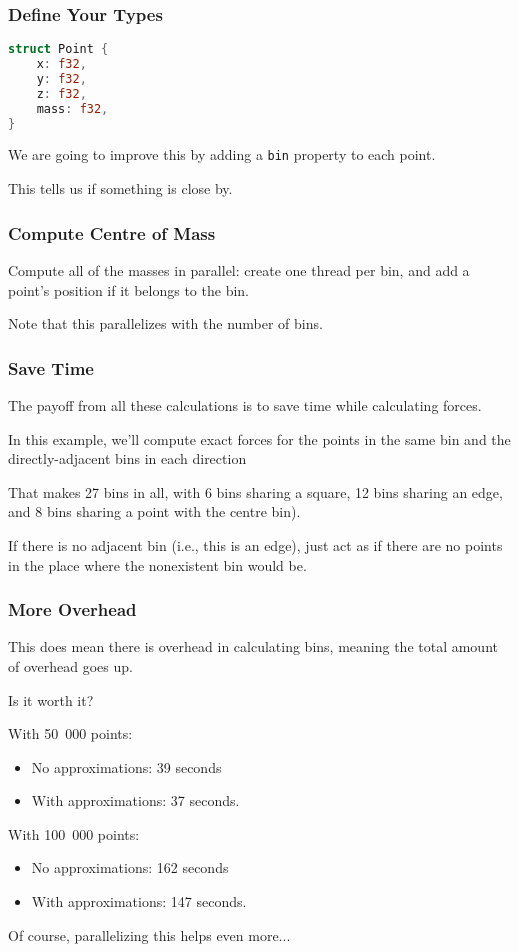\begin{frame}[fragile]
\frametitle{Define Your Types}

\begin{lstlisting}[language=Rust]
struct Point {
    x: f32,
    y: f32,
    z: f32,
    mass: f32,
}
\end{lstlisting}


We are going to improve this by adding a \texttt{bin} property to each point.

This tells us if something is close by.

\end{frame}



\begin{frame}[fragile]
\frametitle{Compute Centre of Mass}

Compute all of the masses in parallel: create one thread per bin, and add a point's
position if it belongs to the bin.


Note that this parallelizes with the number of bins.


\end{frame}

\begin{frame}
\frametitle{Save Time}

The payoff from all these calculations is to save time while calculating forces. 

In this example, we'll compute exact forces for the points in the same bin and the directly-adjacent bins in each direction

That makes 27 bins in all, with 6 bins sharing a square, 12 bins sharing an edge, and 8 bins sharing a point with the centre bin). 

If there is no adjacent bin 
(i.e., this is an edge), just act as if there are no points 
in the place where the nonexistent bin would be. 

\end{frame}


\begin{frame}
\frametitle{More Overhead}

This does mean there is overhead in calculating bins, meaning the total amount of overhead goes up. 

Is it worth it? 

With 50~000 points:
\begin{itemize}
\item    No approximations: 39 seconds
\item    With approximations: 37 seconds.
\end{itemize}

With 100~000 points:
\begin{itemize}
\item    No approximations: 162 seconds
\item    With approximations: 147 seconds.
\end{itemize}

Of course, parallelizing this helps even more... 

\end{frame}




